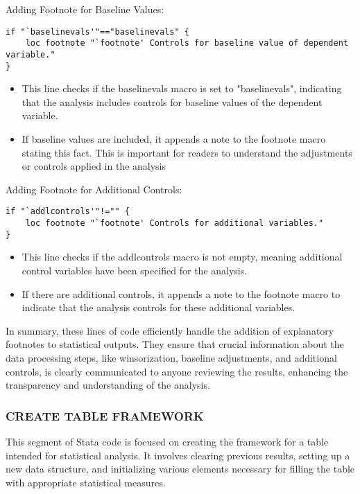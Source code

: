 \documentclass{article}
\begin{document}
Adding Footnote for Baseline Values:

\begin{mdframed}
\begin{verbatim}
if "`baselinevals'"=="baselinevals" {
    loc footnote "`footnote' Controls for baseline value of dependent variable."
}
\end{verbatim}
\end{mdframed}

\begin{itemize}
    \item This line checks if the baselinevals macro is set to "baselinevals", indicating that the analysis includes controls for baseline values of the dependent variable.
    \item If baseline values are included, it appends a note to the footnote macro stating this fact. This is important for readers to understand the adjustments or controls applied in the analysis
\end{itemize}

Adding Footnote for Additional Controls:

\begin{mdframed}
\begin{verbatim}
if "`addlcontrols'"!="" {
    loc footnote "`footnote' Controls for additional variables."
}
\end{verbatim}
\end{mdframed}

\begin{itemize}
    \item This line checks if the addlcontrols macro is not empty, meaning additional control variables have been specified for the analysis.
    \item If there are additional controls, it appends a note to the footnote macro to indicate that the analysis controls for these additional variables.
\end{itemize}

In summary, these lines of code efficiently handle the addition of explanatory footnotes to statistical outputs. They ensure that crucial information about the data processing steps, like winsorization, baseline adjustments, and additional controls, is clearly communicated to anyone reviewing the results, enhancing the transparency and understanding of the analysis.


\subsubsection{CREATE TABLE FRAMEWORK}
\vspace{0.3cm}This segment of Stata code is focused on creating the framework for a table intended for statistical analysis. It involves clearing previous results, setting up a new data structure, and initializing various elements necessary for filling the table with appropriate statistical measures.\newline
\end{document}
